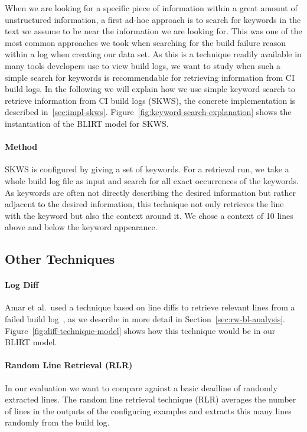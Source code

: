 \documentclass[\myrootdir/main.tex]{subfiles}
\begin{document}
When we are looking for a specific piece of information within a great amount of unstructured information, a first ad-hoc approach is to search for keywords in the text we assume to be near the information we are looking for.
This was one of the most common approaches we took when searching for the build failure reason within a log when creating our data set.
As this is a technique readily available in many tools developers use to view build logs, we want to study when such a simple search for keywords is recommendable for retrieving information from CI build logs.
In the following we will explain how we use simple keyword search to retrieve information from CI build logs (SKWS), the concrete implementation is described in~\ref{sec:impl-skws}.
Figure~\ref{fig:keyword-search-explanation} shows the instantiation of the BLIRT model for SKWS.

\paragraph{Method}
SKWS is configured by giving a set of keywords.
For a retrieval run, we take a whole build log file as input and search for all exact occurrences of the keywords.
As keywords are often not directly describing the desired information but rather adjacent to the desired information, this technique not only retrieves the line with the keyword but also the context around it.
We chose a context of 10 lines above and below the keyword appearance.


\subsection{Other Techniques}
\label{sec:expl-rlr}

\paragraph{Log Diff}
Amar et al.\ used a technique based on line diffs to retrieve relevant lines from a failed build log~\cite{amar2019mining}, as we describe in more detail in Section~\ref{sec:rw-bl-analysis}.
Figure~\ref{fig:diff-technique-model} shows how this technique would be in our BLIRT model.
\paragraph{Random Line Retrieval (RLR)}
In our evaluation we want to compare against a basic deadline of randomly extracted lines.
The random line retrieval technique (RLR) averages the number of lines in the outputs of the configuring examples and extracts this many lines randomly from the build log.
\end{document}
